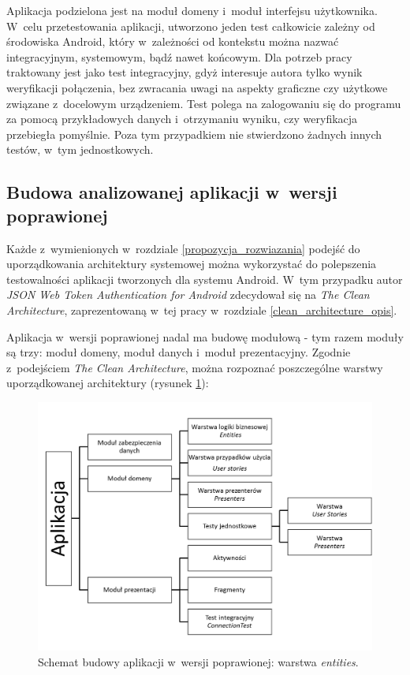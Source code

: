 Aplikacja podzielona jest na moduł domeny i~moduł interfejsu użytkownika. W~celu przetestowania aplikacji, utworzono jeden test całkowicie zależny od środowiska Android, który w~zależności od kontekstu można nazwać integracyjnym, systemowym, bądź nawet końcowym. Dla potrzeb pracy traktowany jest jako test integracyjny, gdyż interesuje autora tylko wynik weryfikacji połączenia, bez zwracania uwagi na aspekty graficzne czy użytkowe związane z~docelowym urządzeniem. Test polega na zalogowaniu się do programu za pomocą przykładowych danych i~otrzymaniu wyniku, czy weryfikacja przebiegła pomyślnie. Poza tym przypadkiem nie stwierdzono żadnych innych testów, w~tym jednostkowych.

\subsection{Budowa analizowanej aplikacji w~wersji poprawionej}
Każde z~wymienionych w~rozdziale \ref{propozycja_rozwiazania} podejść do uporządkowania architektury systemowej można wykorzystać do polepszenia testowalności aplikacji tworzonych dla systemu Android. W~tym przypadku autor \textit{JSON Web Token Authentication for Android} zdecydował się na \textit{The Clean Architecture}, zaprezentowaną w~tej pracy w~rozdziale \ref{clean_architecture_opis}.

\newpage
Aplikacja w~wersji poprawionej nadal ma budowę modułową - tym razem moduły są trzy: moduł domeny, moduł danych i~moduł prezentacyjny. Zgodnie z~podejściem \textit{The Clean Architecture}, można rozpoznać poszczególne warstwy uporządkowanej architektury (rysunek \ref{fig:app_cl}):
\begin{figure}[!htb]
    \centering
    \includegraphics[width=12cm]{imgs/ch6_app_cl_diagram.png}
    \caption
{Schemat budowy aplikacji w~wersji poprawionej: warstwa \textit{entities}.}
    \label{fig:app_cl}
\end{figure} 


